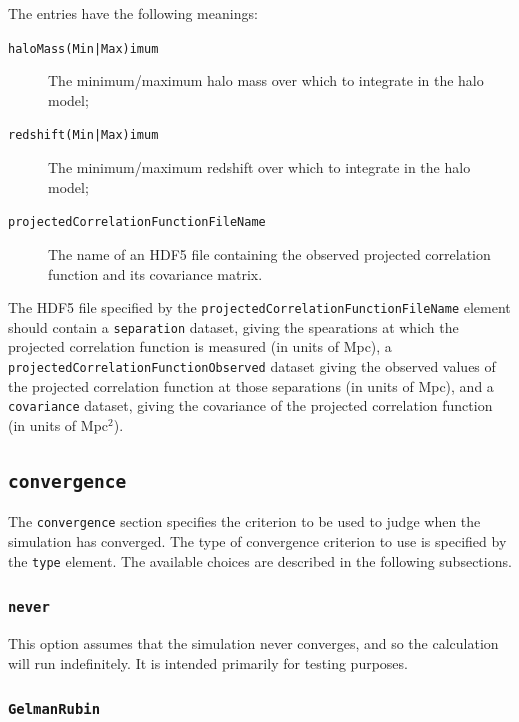 The entries have the following meanings:
\begin{description}
\item[{\tt haloMass(Min|Max)imum}] The minimum/maximum halo mass over which to integrate in the halo model;
\item[{\tt redshift(Min|Max)imum}] The minimum/maximum redshift over which to integrate in the halo model;
\item[{\tt projectedCorrelationFunctionFileName}] The name of an HDF5 file containing the observed projected correlation function and its covariance matrix.
\end{description}

The HDF5 file specified by the {\tt projectedCorrelationFunctionFileName} element should contain a {\tt separation} dataset, giving the spearations at which the projected correlation function is measured (in units of Mpc), a {\tt projectedCorrelationFunctionObserved} dataset giving the observed values of the projected correlation function at those separations (in units of Mpc), and a {\tt covariance} dataset, giving the covariance of the projected correlation function (in units of Mpc$^2$).

\subsection{{\tt convergence}}

The {\tt convergence} section specifies the criterion to be used to judge when the simulation has converged. The type of convergence criterion to use is specified by the {\tt type} element. The available choices are described in the following subsections.

\subsubsection{{\tt never}}

This option assumes that the simulation never converges, and so the calculation will run indefinitely. It is intended primarily for testing purposes.

\subsubsection{{\tt GelmanRubin}}

